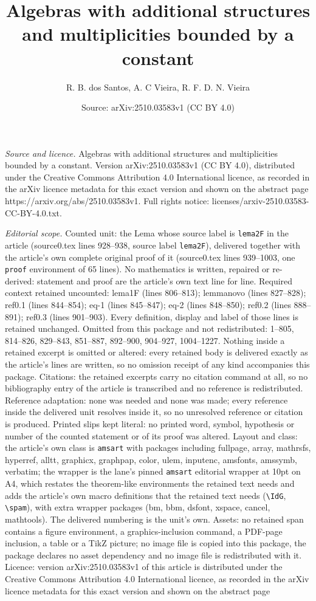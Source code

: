 \documentclass[10pt,a4paper]{amsart}
\title[Algebras with additional structures and multiplicities bound]{Algebras with additional structures and multiplicities bounded by a constant}
\author{R. B. dos Santos, A. C Vieira, R. F. D. N. Vieira}
\date{Source: arXiv:2510.03583v1 (CC BY 4.0)}
\begin{document}
\maketitle

\noindent\emph{Source and licence.} Algebras with additional structures and multiplicities bounded by a constant. Version arXiv:2510.03583v1 (CC BY 4.0), distributed under the Creative Commons Attribution 4.0 International licence, as recorded in the arXiv licence metadata for this exact version and shown on the abstract page https://arxiv.org/abs/2510.03583v1. Full rights notice: licenses/arxiv-2510.03583-CC-BY-4.0.txt.\par\smallskip

\noindent\textit{Editorial scope.} Counted unit: the Lema whose source label is \texttt{lema2F} in the article (source0.tex lines 928--938, source label \texttt{lema2F}), delivered together with the article's own complete original proof of it (source0.tex lines 939--1003, one \texttt{proof} environment of 65 lines). No mathematics is written, repaired or re-derived: statement and proof are the article's own text line for line. Required context retained uncounted: lema1F (lines 806--813); lemmanovo (lines 827--828); ref0.1 (lines 844--854); eq-1 (lines 845--847); eq-2 (lines 848--850); ref0.2 (lines 888--891); ref0.3 (lines 901--903). Every definition, display and label of those lines is retained unchanged. Omitted from this package and not redistributed: 1--805, 814--826, 829--843, 851--887, 892--900, 904--927, 1004--1227. Nothing inside a retained excerpt is omitted or altered: every retained body is delivered exactly as the article's lines are written, so no omission receipt of any kind accompanies this package. Citations: the retained excerpts carry no citation command at all, so no bibliography entry of the article is transcribed and no reference is redistributed. Reference adaptation: none was needed and none was made; every reference inside the delivered unit resolves inside it, so no unresolved reference or citation is produced. Printed slips kept literal: no printed word, symbol, hypothesis or number of the counted statement or of its proof was altered. Layout and class: the article's own class is \texttt{amsart} with packages including fullpage, array, mathrsfs, hyperref, alltt, graphicx, graphpap, color, ulem, inputenc, amsfonts, amssymb, verbatim; the wrapper is the lane's pinned \texttt{amsart} editorial wrapper at 10pt on A4, which restates the theorem-like environments the retained text needs and adds the article's own macro definitions that the retained text needs (\texttt{\textbackslash IdG}, \texttt{\textbackslash spam}), with extra wrapper packages (bm, bbm, dsfont, xspace, cancel, mathtools). The delivered numbering is the unit's own. Assets: no retained span contains a figure environment, a graphics-inclusion command, a PDF-page inclusion, a table or a TikZ picture; no image file is copied into this package, the package declares no asset dependency and no image file is redistributed with it. Licence: version arXiv:2510.03583v1 of this article is distributed under the Creative Commons Attribution 4.0 International licence, as recorded in the arXiv licence metadata for this exact version and shown on the abstract page 
\end{document}
